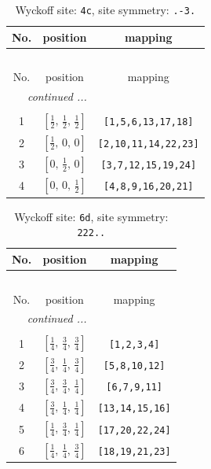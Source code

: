 \documentclass[fleqn,8pt]{jsarticle}
\begin{document}
\renewcommand{\arraystretch}{1.2}
\begin{longtable}{ccc}
\caption{Wyckoff site: {\tt 4c}, site symmetry: {\tt .-3.}}
 \\
 \hline \hline
No. & position & mapping \\ \hline \endfirsthead

\multicolumn{2}{l}{\tablename\ \thetable{}} \\
 \hline \hline
No. & position & mapping \\ \hline \endhead

 \hline \hline
\multicolumn{2}{r}{\footnotesize\it continued ...} \\ \endfoot

 \hline \hline
\multicolumn{2}{r}{} \\ \endlastfoot

1 & $\left[ \frac{1}{2},\, \frac{1}{2},\, \frac{1}{2} \right]$ & {\tt [1,5,6,13,17,18]} \\ \hline
2 & $\left[ \frac{1}{2},\, 0,\, 0 \right]$ & {\tt [2,10,11,14,22,23]} \\ \hline
3 & $\left[ 0,\, \frac{1}{2},\, 0 \right]$ & {\tt [3,7,12,15,19,24]} \\ \hline
4 & $\left[ 0,\, 0,\, \frac{1}{2} \right]$ & {\tt [4,8,9,16,20,21]} \\
\end{longtable}
\renewcommand{\arraystretch}{1.2}
\begin{longtable}{ccc}
\caption{Wyckoff site: {\tt 6d}, site symmetry: {\tt 222..}}
 \\
 \hline \hline
No. & position & mapping \\ \hline \endfirsthead

\multicolumn{2}{l}{\tablename\ \thetable{}} \\
 \hline \hline
No. & position & mapping \\ \hline \endhead

 \hline \hline
\multicolumn{2}{r}{\footnotesize\it continued ...} \\ \endfoot

 \hline \hline
\multicolumn{2}{r}{} \\ \endlastfoot

1 & $\left[ \frac{1}{4},\, \frac{3}{4},\, \frac{3}{4} \right]$ & {\tt [1,2,3,4]} \\ \hline
2 & $\left[ \frac{3}{4},\, \frac{1}{4},\, \frac{3}{4} \right]$ & {\tt [5,8,10,12]} \\ \hline
3 & $\left[ \frac{3}{4},\, \frac{3}{4},\, \frac{1}{4} \right]$ & {\tt [6,7,9,11]} \\ \hline
4 & $\left[ \frac{3}{4},\, \frac{1}{4},\, \frac{1}{4} \right]$ & {\tt [13,14,15,16]} \\ \hline
5 & $\left[ \frac{1}{4},\, \frac{3}{4},\, \frac{1}{4} \right]$ & {\tt [17,20,22,24]} \\ \hline
6 & $\left[ \frac{1}{4},\, \frac{1}{4},\, \frac{3}{4} \right]$ & {\tt [18,19,21,23]} \\
\end{longtable}
\end{document}
